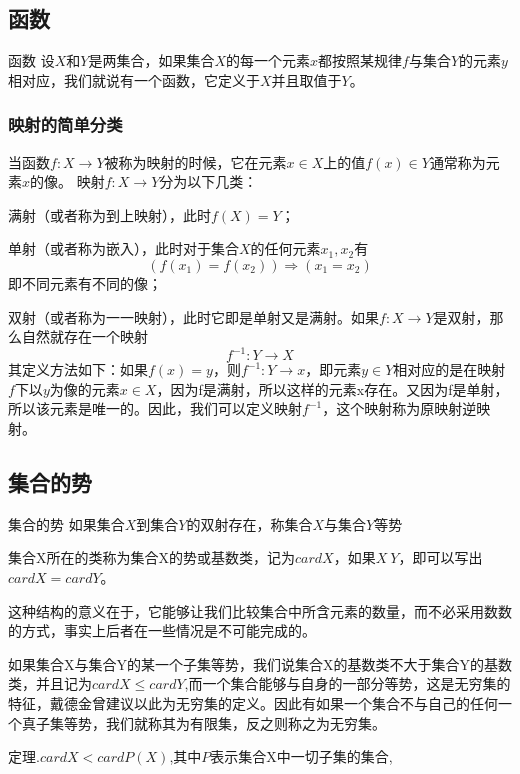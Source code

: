\subsection{函数}
\begin{definition}{函数}{}
设$X$和$Y$是两集合，如果集合$X$的每一个元素$x$都按照某规律$f$与集合$Y$的元素$y$相对应，我们就说有一个函数，它定义于$X$并且取值于$Y$。
\end{definition}
\subsubsection{映射的简单分类}
当函数$f:X\rightarrow Y$被称为映射的时候，它在元素$x\in X$上的值$f(x)\in Y$通常称为元素$x$的像。
映射$f:X\rightarrow Y$分为以下几类：

满射（或者称为到上映射），此时$f(X)=Y$；

单射（或者称为嵌入），此时对于集合$X$的任何元素$x_1,x_2$有
\[(f(x_1)=f(x_2))\Rightarrow (x_1=x_2)\]
即不同元素有不同的像；

双射（或者称为一一映射），此时它即是单射又是满射。如果$f:X\rightarrow Y$是双射，那么自然就存在一个映射
\[f^{-1}:Y\rightarrow X\]
其定义方法如下：如果$f(x)=y$，则$f^{-1}:Y\rightarrow x$，即元素$y\in Y$相对应的是在映射$f$下以$y$为像的元素$x\in X$，因为f是满射，所以这样的元素x存在。又因为f是单射，所以该元素是唯一的。因此，我们可以定义映射$f^{-1}$，这个映射称为原映射逆映射。
\subsection{集合的势}
\begin{definition}{集合的势}{}
如果集合$X$到集合$Y$的双射存在，称集合$X$与集合$Y$等势
\end{definition}
集合X所在的类称为集合X的势或基数类，记为$cardX$，如果$X~Y$，即可以写出$cardX=cardY$。

这种结构的意义在于，它能够让我们比较集合中所含元素的数量，而不必采用数数的方式，事实上后者在一些情况是不可能完成的。

如果集合X与集合Y的某一个子集等势，我们说集合X的基数类不大于集合Y的基数类，并且记为$cardX\leq cardY$,而一个集合能够与自身的一部分等势，这是无穷集的特征，戴德金曾建议以此为无穷集的定义。因此有如果一个集合不与自己的任何一个真子集等势，我们就称其为有限集，反之则称之为无穷集。

定理.$cardX<cardP(X)$,其中$P$表示集合X中一切子集的集合,